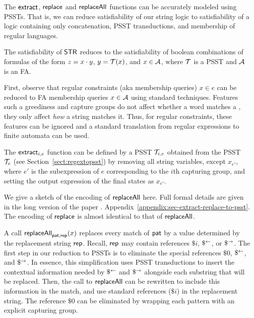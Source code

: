 
The $\mathsf{extract}$, $\mathsf{replace}$ and $\mathsf{replaceAll}$ functions can be accurately modeled using PSSTs.
That is, we can reduce satisfiability of our string logic to satisfiability of a logic containing only concatenation, PSST transductions, and membership of regular languages.

\begin{lemma}\label{lem-str-fun-to-psst}
    The satisfiability of $\mathsf{STR}$ reduces to the satisfiability of boolean combinations of formulas of the form $z=x \cdot y$, $y=\mathcal{T}(x)$, and $x \in \mathcal{A}$, where $\mathcal{T}$ is a PSST and $\mathcal{A}$ is an FA.
\end{lemma}

First, observe that regular constraints (aka membership queries) $x \in e$ can be reduced to FA membership queries $x \in \mathcal{A}$ using standard techniques.
Features such a greediness and capture groups do not affect whether a word matches a {\regexp}, they only affect \emph{how} a string matches it.
Thus, for  regular constraints, these features can be ignored and a standard translation from regular expressions to finite automata can be used.

The $\mathsf{extract}_{i,e}$ function can be defined by a PSST $\mathcal{T}_{i,e}$ obtained from the PSST $\mathcal{T}_e$ (see Section~\ref{sect:regextopsst}) by removing all string variables, except $x_{e'}$, where $e'$ is the subexpression of $e$ corresponding to the $i$th capturing group, and setting the output expression of the final states as $x_{e'}$.

We give a sketch of the encoding of $\mathsf{replaceAll}$ here.
Full formal details are given in \ifproceeding the long version of the paper \cite{popl22-full}. \else Appendix~\ref{appendix:sec-extract-replace-to-psst}. \fi
The encoding of $\mathsf{replace}$ is almost identical to that of $\mathsf{replaceAll}$.

A call $\mathsf{replaceAll}_{\mathsf{pat}, \mathsf{rep}}(x)$ replaces every match of $\mathsf{pat}$ by a value determined by the replacement string $\mathsf{rep}$.
Recall, $\mathsf{rep}$ may contain references $\$i$, $\$^{\leftarrow}$, or $\$^{\rightarrow}$.
The first step in our reduction to PSSTs is to eliminate the special references $\$0$, $\$^{\leftarrow}$, and $\$^{\rightarrow}$.
In essence, this simplification uses PSST transductions to insert the contextual information needed by $\$^{\leftarrow}$ and $\$^{\rightarrow}$ alongside each substring that will be replaced.
Then, the call to $\mathsf{replaceAll}$ can be rewritten to include this information in the match, and use standard references ($\$i$) in the replacement string.
The reference $\$0$ can be eliminated by wrapping each pattern with an explicit capturing group.

